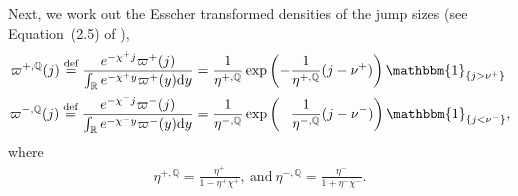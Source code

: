 \documentclass[11pt,a4paper]{article}
\numberwithin{equation}{section}
\theoremstyle{remark}
\theoremstyle{definition}
\begin{document}
Next, we work out the Esscher transformed densities of the jump sizes (see Equation~(2.5) of \cite{gerber1995option}),
\begin{align*}
    \varpi^{+,\mathbb{Q}}(j) \overset{\text{def}}= \frac{e^{-\chi^+ j}\varpi^{+}(j)}{\int_\mathbb{R} e^{-\chi^+ y}\varpi^+(y) \text{d}y} &= \frac{1}{\eta^{+, \mathbb{Q}}}\exp\left(-\frac{1}{\eta^{+, \mathbb{Q}}}(j-\nu^+)\right)\mathbbm{1}_{\{j > \nu^+\}}\\
    \varpi^{-,\mathbb{Q}}(j) \overset{\text{def}}= \frac{e^{-\chi^- j}\varpi^{-}(j)}{\int_\mathbb{R} e^{-\chi^- y}\varpi^-(y) \text{d}y}&= \frac{1}{\eta^{-, \mathbb{Q}}}\exp\left(\phantom{-}\frac{1}{\eta^{-, \mathbb{Q}}}(j-\nu^-)\right)\mathbbm{1}_{\{j < \nu^-\}},
\end{align*}
where
\begin{align*}
    \eta^{+,\mathbb{Q}}
    = \frac{\eta^+}{1-\eta^+\chi^+}, \ \text{and}\
    \eta^{-,\mathbb{Q}}
    = \frac{\eta^-}{1+\eta^-\chi^-}.
\end{align*}
\end{document}
